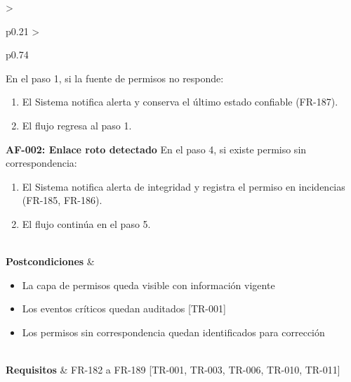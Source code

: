 \begin{longtable}{>{\raggedright\arraybackslash}p{0.21\textwidth} >{\raggedright\arraybackslash}p{0.74\textwidth}}
{\newline
En el paso 1, si la fuente de permisos no responde:
\begin{enumerate}[leftmargin=1.5em, nosep, topsep=0pt]
\item El Sistema notifica alerta y conserva el último estado confiable (FR-187).
\item El flujo regresa al paso 1.
\end{enumerate}
\vspace{4pt}\noindent\textbf{AF-002: Enlace roto detectado}
\newline
En el paso 4, si existe permiso sin correspondencia:
\begin{enumerate}[leftmargin=1.5em, nosep, topsep=0pt]
\item El Sistema notifica alerta de integridad y registra el permiso en incidencias (FR-185, FR-186).
\item El flujo continúa en el paso 5.
\end{enumerate} \vspace{2pt}} \\
\textbf{Postcondiciones} & \parbox[t]{\linewidth}{\vspace{2pt} \begin{itemize}[leftmargin=1.5em, nosep, topsep=0pt]
\item La capa de permisos queda visible con información vigente
\item Los eventos críticos quedan auditados [TR-001]
\item Los permisos sin correspondencia quedan identificados para corrección
\end{itemize} \vspace{2pt}} \\
\textbf{Requisitos} & FR-182 a FR-189 [TR-001, TR-003, TR-006, TR-010, TR-011] \\ \bottomrule
\end{longtable}\normalsize\vspace{1em}